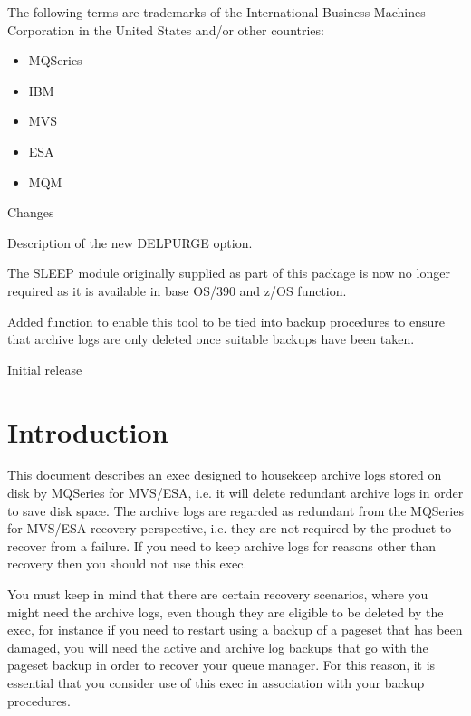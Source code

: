 \documentclass[a4paper,12pt]{report}
\begin{document}
The following terms
are trademarks of the International Business Machines Corporation
in the United States and/or other countries:
\begin{itemize}[noitemsep]
\item MQSeries
\item IBM
\item MVS
\item ESA
\item MQM
\end{itemize}

\begin{description}[labelwidth=3cm]
\item [Date] Changes
\item [April 2005] Description of the new DELPURGE option.
\item [September 2002] The SLEEP module originally supplied as part of this package is now
no longer required as it is available in base OS/390 and z/OS function.
\item [20th December 1999] Added function to enable this tool to be tied into backup procedures
to ensure that archive logs are only deleted once suitable backups have
been taken.
\item [20th October 1999] Initial release
\end{description}
%
%
\chapter{Introduction}
%

This document describes an exec designed to housekeep archive logs
stored on disk by MQSeries for MVS/ESA, i.e. it will delete redundant
archive logs in order to save disk space.  The archive logs are regarded
as redundant from the MQSeries for MVS/ESA recovery perspective, i.e.
they are not required by the product to recover from a failure.  If you
need to keep archive logs for reasons other than recovery then you
should not use this exec.

You must keep in mind that there are certain recovery scenarios,
where you might need the archive logs, even though they are eligible to
be deleted by the exec, for instance if you need to restart using a
backup of a pageset that has been damaged, you will need the active and
archive log backups that go with the pageset backup in order to
recover your queue manager.  For this reason, it is essential that you
consider use of this exec in association with your backup procedures.
\end{document}
